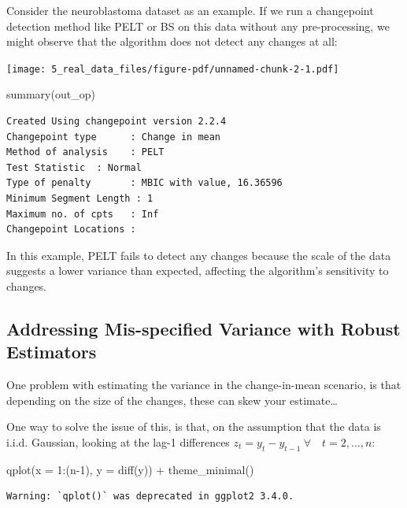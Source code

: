 \documentclass[
  letterpaper,
  DIV=11,
  numbers=noendperiod]{scrreprt}
\newenvironment{Shaded}{\begin{snugshade}}{\end{snugshade}}
\newcommand{\AttributeTok}[1]{\textcolor[rgb]{0.40,0.45,0.13}{#1}}
\newcommand{\DecValTok}[1]{\textcolor[rgb]{0.68,0.00,0.00}{#1}}
\newcommand{\FunctionTok}[1]{\textcolor[rgb]{0.28,0.35,0.67}{#1}}
\newcommand{\NormalTok}[1]{\textcolor[rgb]{0.00,0.23,0.31}{#1}}
\newcommand{\SpecialCharTok}[1]{\textcolor[rgb]{0.37,0.37,0.37}{#1}}
\begin{document}
Consider the neuroblastoma dataset as an example. If we run a
changepoint detection method like PELT or BS on this data without any
pre-processing, we might observe that the algorithm does not detect any
changes at all:

\texttt{[image: 5\_real\_data\_files/figure-pdf/unnamed-chunk-2-1.pdf]}

\begin{Shaded}
\begin{Highlighting}[]
\FunctionTok{summary}\NormalTok{(out\_op)}
\end{Highlighting}
\end{Shaded}

\begin{verbatim}
Created Using changepoint version 2.2.4 
Changepoint type      : Change in mean 
Method of analysis    : PELT 
Test Statistic  : Normal 
Type of penalty       : MBIC with value, 16.36596 
Minimum Segment Length : 1 
Maximum no. of cpts   : Inf 
Changepoint Locations :  
\end{verbatim}

In this example, PELT fails to detect any changes because the scale of
the data suggests a lower variance than expected, affecting the
algorithm's sensitivity to changes.

\subsection{Addressing Mis-specified Variance with Robust
Estimators}\label{addressing-mis-specified-variance-with-robust-estimators}

One problem with estimating the variance in the change-in-mean scenario,
is that depending on the size of the changes, these can skew your
estimate\ldots{}

One way to solve the issue of this, is that, on the assumption that the
data is i.i.d. Gaussian, looking at the lag-1 differences
\(z_t =  y_t - y_{t-1} \ \forall \quad t = 2, \dots, n\):

\begin{Shaded}
\begin{Highlighting}[]
\FunctionTok{qplot}\NormalTok{(}\AttributeTok{x =} \DecValTok{1}\SpecialCharTok{:}\NormalTok{(n}\DecValTok{{-}1}\NormalTok{), }\AttributeTok{y =} \FunctionTok{diff}\NormalTok{(y)) }\SpecialCharTok{+} \FunctionTok{theme\_minimal}\NormalTok{()}
\end{Highlighting}
\end{Shaded}

\begin{verbatim}
Warning: `qplot()` was deprecated in ggplot2 3.4.0.
\end{verbatim}
\end{document}
